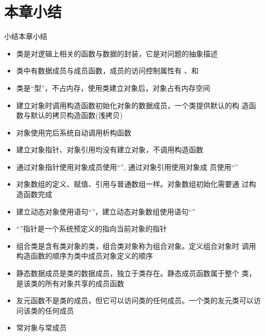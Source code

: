 \section[小结]{本章小结}\label{sec:chap03-sec08}
\begin{frame}{小结}{本章小结}%
  \stretchon
  \begin{itemize}
  \item 类是对逻辑上相关的函数与数据的封装，它是对问题的抽象描述
  \item 类中有数据成员与成员函数，成员的访问控制属性有
    、和
  \item \alert{类是“型”，不占内存}，使用类建立对象后，\alert{对象占有内存空间}
  \item 建立对象时\alert{调用构造函数初始化对象的数据成员}，一个类提供默认的构
    造函数与默认的拷贝构造函数(\alert{浅拷贝})
  \item 对象使用完后系统\alert{自动调用析构函数}
  \item 建立\alert{对象指针、对象引用均没有建立对象}，不调用构造函数
  \item 通过对象指针使用对象成员使用``\cppinline{->}'', 通过对象引用使用对象成
    员使用``''
  \item 对象数组的定义、赋值、引用与普通数组一样。\alert{对象数组初始化需要通
    过构造函数完成}
  \item 建立动态对象使用语句``''，建立动态对象数组使用语句``'' 
  \item ``''指针是一个系统预定义的\alert{指向当前对象的指针}
  \item 组合类是含有类对象的类，组合类对象称为组合对象。定义组合对象时
    调用构造函数的顺序为\alert{类中成员对象定义的顺序}
  \item 静态数据成员是类的数据成员，\alert{独立于类存在}。静态成员函数属于整个
    类，是该类的\alert{所有对象共享的成员函数}
  \item 友元函数\alert{不是类的成员}，但它\alert{可以访问类的任何成员}。一个类的友元类可以访问该类的任何成员
  \item 常对象与常成员
  \end{itemize}
  \stretchoff
\end{frame}


